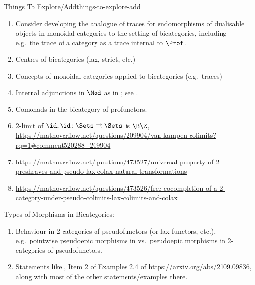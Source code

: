\begin{remark}{Things To Explore/Add}{things-to-explore-add}
\begin{enumerate}
            \begin{enumerate}
                \item Can we abstract the structure provided to $\TwoCategoryOfCategories$ by natural cotransformations?
                \item Are there analogues of cotransformations for $\sfbfRel$, $\Span$, $\BiMod$, $\MonAct$, etc.?
                \item Perhaps this might also make sense as a 1-categorical definition, e.g.\ comorphisms of groups from $A$ to $B$ as $\Sets(A,B)$ quotiented by $f(ab)\sim f(a)f(b)$.
            \end{enumerate}
        \item Consider developing the analogue of traces for endomorphisms of dualisable objects in monoidal categories to the setting of bicategories, including e.g.\ the trace of a category as a trace internal to $\Prof$.
        \item Centres of bicategories (lax, strict, etc.)
        \item Concepts of monoidal categories applied to bicategories (e.g.\ traces)
        \item Internal adjunctions in $\Mod$ as in \cite[Section 6.3]{2-categories-book}; see \cite[Example 6.2.6]{2-categories-book}.
        \item Comonads in the bicategory of profunctors.
        \item 2-limit of $\id,\id\colon\Sets\rightrightarrows\Sets$ is $\B\Z$, \url{https://mathoverflow.net/questions/209904/van-kampen-colimits?rq=1#comment520288_209904}
        \item \url{https://mathoverflow.net/questions/473527/universal-property-of-2-presheaves-and-pseudo-lax-colax-natural-transformations}
        \item \url{https://mathoverflow.net/questions/473526/free-cocompletion-of-a-2-category-under-pseudo-colimits-lax-colimits-and-colax}
    \end{enumerate}
    Types of Morphisms in Bicategories:
    \begin{enumerate}
        \item Behaviour in 2-categories of pseudofunctors (or lax functors, etc.), e.g.\ pointwise pseudoepic morphisms in vs.\ pseudoepic morphisms in 2-categories of pseudofunctors.
        \item Statements like , Item 2 of Examples 2.4 of \url{https://arxiv.org/abs/2109.09836}, along with most of the other statements/examples there.

\end{enumerate}
\end{remark}
